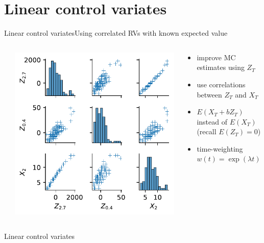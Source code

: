 \documentclass[9pt]{beamer}
\newcommand{\expSym}{{E}}
\newcommand{\E}[1]{\ensuremath{\expSym\left(#1\right)}}
\begin{document}
\section{Linear control variates}
\begin{frame}{Linear control variates}{Using correlated RVs with known expected value}
    \begin{columns}
        \begin{column}{.03\paperwidth}
        \end{column}
        \begin{column}{.4\textwidth}
            \includegraphics[width=.8\textwidth]{../gfx/correlation.pdf}
        \end{column}
        \begin{column}{.50\paperwidth}
            \begin{itemize}
                \item improve MC estimates using $Z_T$
                \item use correlations between $Z_T$ and $X_T$
                \item $\E{X_T + b Z_T}$ instead of $\E{X_T}$\\ (recall $\E{Z_T}=0$)
                \item time-weighting $w(t)=\exp(\lambda t)$
            \end{itemize}
        \end{column}
    \end{columns}
    \begin{block}{Linear control variates}

\end{block}
\end{frame}
\end{document}
